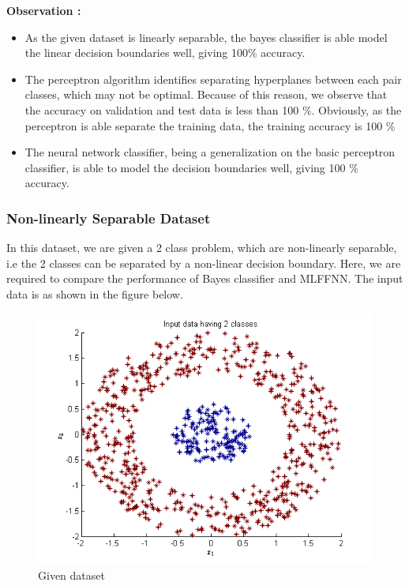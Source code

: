 \documentclass{article}
\begin{document}
\begin{flushleft}
\textbf{Observation :}
\begin{itemize}
\item As the given dataset is linearly separable, the bayes classifier is able model the linear decision boundaries well, giving 100\% accuracy.
\item The perceptron algorithm identifies separating hyperplanes between each pair classes, which may not be optimal. Because of this reason, we observe that the accuracy on validation and test data is less than 100 \%. Obviously, as the perceptron is able separate the training data, the training accuracy is 100 
\%
\item The neural network classifier, being a generalization on the basic perceptron classifier, is able to  model the decision boundaries well, giving 100 \% accuracy.
\end{itemize}
\newpage
\end{flushleft}

\subsubsection{Non-linearly Separable Dataset}
\begin{flushleft}

In this dataset, we are given a 2 class problem, which are non-linearly separable, i.e the 2 classes can be separated by a non-linear decision boundary. Here, we are required to compare the performance of Bayes classifier and MLFFNN.
The input data is as shown in the figure below. \\[10pt]

\end{flushleft}

\begin{figure}[H]

\centering
\includegraphics[width=\linewidth]{Classification/nonlinearlySeparable/input_data.png}
\caption{Given dataset}
\end{figure}
\end{document}
